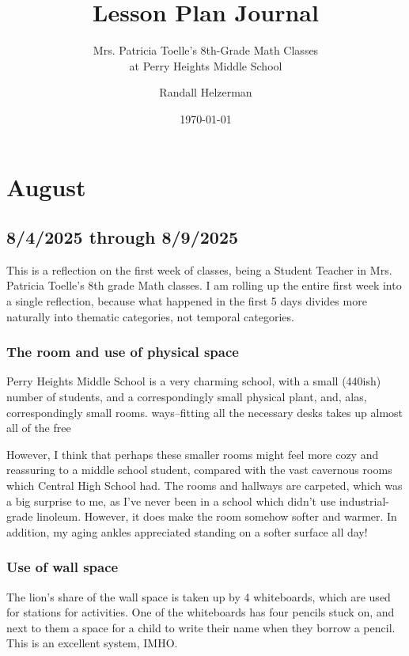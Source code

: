 \documentclass[11pt]{elegantbook}
\title{Lesson Plan Journal}
\subtitle{Mrs. Patricia Toelle's 8th-Grade Math Classes \\ at Perry
  Heights Middle School}
\author{Randall Helzerman}
\institute{University of Evansville}
\date{\today}
\begin{document}
\maketitle

\frontmatter
\tableofcontents

\mainmatter


\part{August}

\chapter{8/4/2025 through 8/9/2025}

This is a reflection on the first week of classes, being a Student
Teacher in Mrs. Patricia Toelle's 8th grade Math classes.  I am
rolling up the entire first week into a single reflection, because
what happened in the first 5 days divides more naturally into thematic
categories, not temporal categories.

\section*{The room and use of physical space}

Perry Heights Middle School is a very charming school, with a small
(440ish) number of students, and a correspondingly small physical
plant, and, alas, correspondingly small rooms.
ways--fitting all the necessary desks takes up almost all of the free

However, I think that perhaps these smaller rooms might feel more cozy
and reassuring to a middle school student, compared with the vast
cavernous rooms which Central High School had.  The rooms and hallways
are carpeted, which was a big surprise to me, as I've never been in a
school which didn't use industrial-grade linoleum.  However, it does
make the room somehow softer and warmer.  In addition, my aging ankles
appreciated standing on a softer surface all day!

\section*{Use of wall space}

The lion's share of the wall space is taken up by 4 whiteboards, which
are used for stations for activities.  One of the whiteboards has four
pencils stuck on, and next to them a space for a child to write their
name when they borrow a pencil. This is an excellent system, IMHO.
\end{document}
